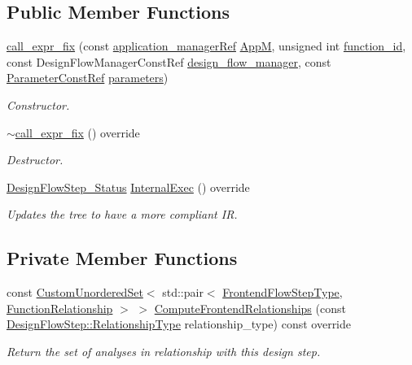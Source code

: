 \subsection*{Public Member Functions}
\begin{DoxyCompactItemize}
\item 
\hyperlink{classcall__expr__fix_a594e31d69f9195fe9a8c309c671c812a}{call\+\_\+expr\+\_\+fix} (const \hyperlink{application__manager_8hpp_a04ccad4e5ee401e8934306672082c180}{application\+\_\+manager\+Ref} \hyperlink{classFrontendFlowStep_a0ac0d8db2a378416583f51c4faa59d15}{AppM}, unsigned int \hyperlink{classFunctionFrontendFlowStep_a58ef2383ad1a212a8d3f396625a4b616}{function\+\_\+id}, const Design\+Flow\+Manager\+Const\+Ref \hyperlink{classDesignFlowStep_ab770677ddf087613add30024e16a5554}{design\+\_\+flow\+\_\+manager}, const \hyperlink{Parameter_8hpp_a37841774a6fcb479b597fdf8955eb4ea}{Parameter\+Const\+Ref} \hyperlink{classDesignFlowStep_a802eaafe8013df706370679d1a436949}{parameters})
\begin{DoxyCompactList}\small\item\em Constructor. \end{DoxyCompactList}\item 
\hyperlink{classcall__expr__fix_afab1acad9ea02275ec326ad5a1a920fd}{$\sim$call\+\_\+expr\+\_\+fix} () override
\begin{DoxyCompactList}\small\item\em Destructor. \end{DoxyCompactList}\item 
\hyperlink{design__flow__step_8hpp_afb1f0d73069c26076b8d31dbc8ebecdf}{Design\+Flow\+Step\+\_\+\+Status} \hyperlink{classcall__expr__fix_a4aa8f0db73ae82fe5de110e96185355e}{Internal\+Exec} () override
\begin{DoxyCompactList}\small\item\em Updates the tree to have a more compliant IR. \end{DoxyCompactList}\end{DoxyCompactItemize}
\subsection*{Private Member Functions}
\begin{DoxyCompactItemize}
\item 
const \hyperlink{classCustomUnorderedSet}{Custom\+Unordered\+Set}$<$ std\+::pair$<$ \hyperlink{frontend__flow__step_8hpp_afeb3716c693d2b2e4ed3e6d04c3b63bb}{Frontend\+Flow\+Step\+Type}, \hyperlink{classFrontendFlowStep_af7cf30f2023e5b99e637dc2058289ab0}{Function\+Relationship} $>$ $>$ \hyperlink{classcall__expr__fix_a41375743516dfd715cdc33c8b6b59fd2}{Compute\+Frontend\+Relationships} (const \hyperlink{classDesignFlowStep_a723a3baf19ff2ceb77bc13e099d0b1b7}{Design\+Flow\+Step\+::\+Relationship\+Type} relationship\+\_\+type) const override
\begin{DoxyCompactList}\small\item\em Return the set of analyses in relationship with this design step. \end{DoxyCompactList}\end{DoxyCompactItemize}
